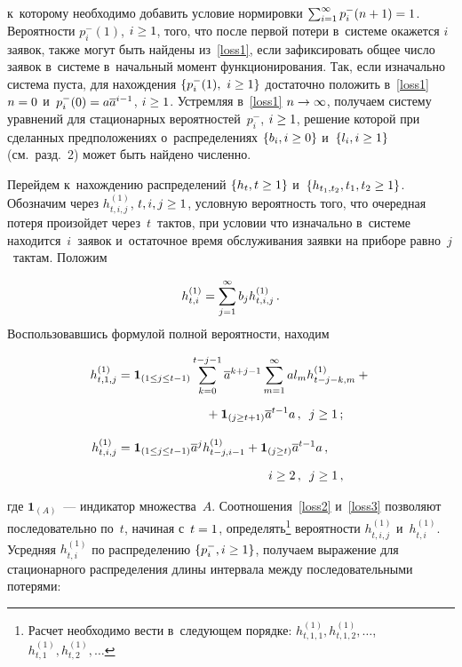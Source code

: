 \begin{multicols}{2}
\noindent к~которому необходимо добавить условие нормировки 
$\sum\nolimits_{i=1}^{\infty} p_i^-(n+1)\hm=1$.
Вероятности $p_i^-(1)$, $i \hm\ge 1$, того, что после первой потери 
в~системе окажется
$i$ заявок, также могут быть найдены из~\eqref{loss1}, если зафиксировать
общее число заявок в~системе в~начальный момент функционирования.
Так, если изначально система пуста,
для нахождения $\{ p_i^-(1), \ i \hm\ge 1\}$ достаточно положить 
в~\eqref{loss1}
$n\hm=0$ и~$p_i^-(0)\hm=a \overline{a}^{i-1}$, $i \hm\ge 1$. Устремляя 
в~\eqref{loss1} $n \hm\rightarrow \infty$,
получаем систему уравнений для стационарных вероятностей~$p_i^-$, $i 
\hm\ge 1$,
решение которой при сделанных предположениях
о~распределениях $\{ b_i, i \hm\ge 0\}$ и~$\{ l_i, i \hm\ge 1\}$
(см.\ разд.~2) может быть найдено чис\-лен\-но.

Перейдем к~нахождению распределений $\{h_{t},\linebreak t \hm\ge 1\}$ 
и~$\{h_{t_1,t_2}, t_1,t_2 \hm\ge 1\}$.
Обозначим через $h^{(1)}_{t,i,j}$, $t,i,j \hm\ge 1$, условную вероятность 
того, что
очередная потеря произойдет через~$t$~тактов, при условии что изначально
в~системе находится~$i$~заявок и~остаточное время обслуживания
заявки на приборе равно~$j$~тактам. Положим 

\noindent
$$
h^{(1)}_{t,i}\hm=\sum\limits_{j=1}^\infty b_j h^{(1)}_{t,i,j}\,.
$$
Воспользовавшись формулой полной вероятности, находим

\vspace*{-2pt}

\noindent
\begin{align}
\label{loss2}
h^{(1)}_{t,1,j}&=
{\mathbf{1}_{(1 \le j \le t-1)}}
\sum\limits_{k=0}^{t-j-1} \overline{a}^{k+j-1}
\sum\limits_{m=1}^{\infty} a l_m h^{(1)}_{t-j-k,m}
+ {}\notag\\[6pt]
&\hspace*{25mm}{}+{\mathbf{1}_{(j \ge t+1)}}
\overline{a}^{t-1} a\,, \enskip j\ge 1\,;\\[9pt]
\label{loss3}
h^{(1)}_{t,i,j}&=
{\mathbf{1}_{(1 \le j \le t-1)}}
\overline{a}^{j} h^{(1)}_{t-j,i-1}
+
{\mathbf{1}_{(j \ge t)}}
\overline{a}^{t-1} a\,,\notag\\[6pt]
&\hspace*{41mm}\enskip i \ge 2\,, \enskip j\ge 1\,,
\end{align}

\vspace*{-2pt}

\noindent где ${\mathbf{1}_{(A)}}$~--- индикатор множества~$A$.
Соотношения~\eqref{loss2} и~\eqref{loss3} позволяют
последовательно по~$t$, начиная с~$t\hm=1$, определять\footnote{Расчет 
необходимо
вести в~следующем порядке: $h^{(1)}_{t,1,1}, h^{(1)}_{t,1,2},\dots$,
$h^{(1)}_{t,1},h^{(1)}_{t,2},\dots$} вероятности $h^{(1)}_{t,i,j}$
и~$h^{(1)}_{t,i}$. Усредняя $h^{(1)}_{t,i}$ по распределению $\{ p_i^-, i 
\hm\ge 1\}$, получаем
выражение для стационарного распределения длины
интервала между последовательными потерями:


\end{multicols}
